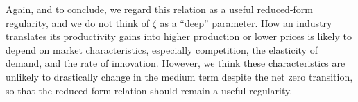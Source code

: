 Again, and to conclude, we regard this relation as a useful reduced-form regularity, and we do not think of $\zeta$ as a ``deep'' parameter. How an industry translates its productivity gains into higher production or lower prices is likely to depend on market characteristics, especially competition, the elasticity of demand, and the rate of innovation. However, we think these characteristics are unlikely to drastically change in the medium term despite the net zero transition, so that the reduced form relation should remain a useful regularity.
